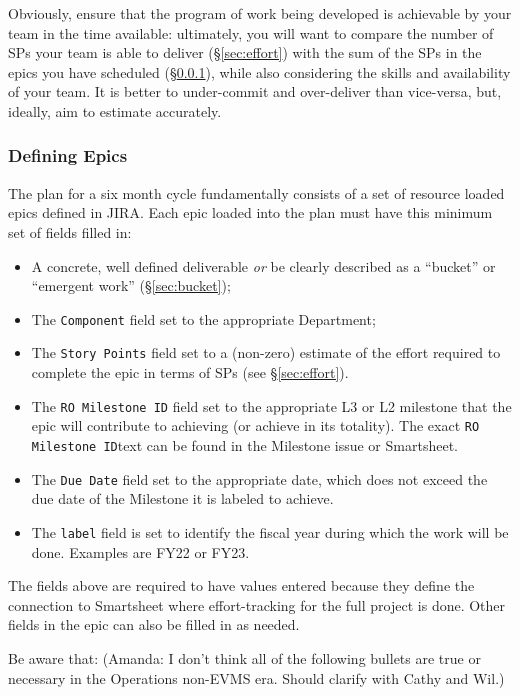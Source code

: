 Obviously, ensure that the program of work being developed is achievable by your team in the time available: ultimately, you will want to compare the number of \glspl{SP} your team is able to deliver (\S\ref{sec:effort}) with the sum of the \glspl{SP} in the \glspl{epic} you have scheduled (\S\ref{sec:planning-epics}), while also considering the skills and availability of your team.
It is better to under-commit and over-deliver than vice-versa, but, ideally, aim to estimate accurately.

\subsubsection{Defining Epics} \label{sec:planning-epics}

The plan for a six month \gls{cycle} fundamentally consists of a set of resource loaded \glspl{epic} defined in \gls{JIRA}.
Each \gls{epic} loaded into the plan must have this minimum set of fields filled in:

\begin{itemize}
\item A concrete, well defined deliverable \emph{or} be clearly described as a ``bucket'' or ``emergent work'' (\S\ref{sec:bucket});
\item The \texttt{Component} field set to the appropriate Department;
\item The \texttt{Story Points} field set to a (non-zero) estimate of the effort required to complete the \gls{epic} in terms of \glspl{SP} (see \S\ref{sec:effort}).
\item The \texttt{RO Milestone ID} field set to the appropriate L3 or L2 milestone that the epic will contribute to achieving (or achieve in its totality).
  The exact \texttt{RO Milestone ID}text can be found in the Milestone issue or Smartsheet.
\item The \texttt{Due Date} field set to the appropriate date, which does not exceed the due date of the Milestone it is labeled to achieve.
\item The \texttt{label} field is set to identify the fiscal year during which the work will be done. Examples are FY22 or FY23.

\end{itemize}
The fields above are required to have values entered because they define the connection to Smartsheet where effort-tracking for the full project is done. Other fields in the epic can also be filled in as needed.

Be aware that: (Amanda: I don't think all of the following bullets are true or necessary in the Operations non-EVMS era.  Should clarify with Cathy and Wil.)

